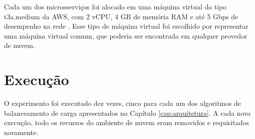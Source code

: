 Cada um dos microsserviços foi alocado em uma máquina virtual do tipo t3a.medium da AWS, com 2 vCPU, 4 GB de memória RAM e até 5 Gbps de desempenho na rede \citep{AWSTypes}. Esse tipo de máquina virtual foi escolhido por representar uma máquina virtual comum, que poderia ser encontrada em qualquer provedor de nuvem.



\section{Execução}
O experimento foi executado dez vezes, cinco para cada um dos algoritmos de balanceamento de carga apresentados no Capítulo \ref{cap:arquitetura}. A cada nova execução, todo os recursos do ambiente de nuvem eram removidos e requisitados novamente.






